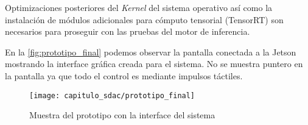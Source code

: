 Optimizaciones posteriores del \emph{Kernel} del sistema operativo así como la
instalación de módulos adicionales para cómputo tensorial (TensorRT) son
necesarios para proseguir con las pruebas del motor de inferencia.

En la \autoref{fig:prototipo_final} podemos observar la pantalla conectada a la
Jetson mostrando la interface gráfica creada para el sistema. No se muestra
puntero en la pantalla ya que todo el control es mediante impulsos táctiles.

\begin{figure}[]
    \centering
    \texttt{[image: capitulo\_sdac/prototipo\_final]}
    \caption{Muestra del prototipo con la interface del sistema}\label{fig:prototipo_final}
\end{figure}

